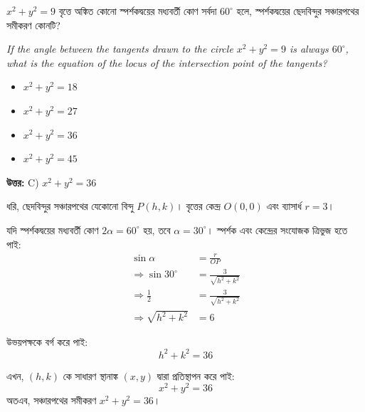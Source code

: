 \documentclass[12pt, a4paper]{article}
\begin{document}
\begin{tcolorbox}[questionbox={প্রশ্ন (Question) 22}]
    \noindent
    $x^2 + y^2 = 9$ বৃত্তে অঙ্কিত কোনো স্পর্শকদ্বয়ের মধ্যবর্তী কোণ সর্বদা $60^{\circ}$ হলে, স্পর্শকদ্বয়ের ছেদবিন্দুর সঞ্চারপথের সমীকরণ কোনটি?
    
    \vspace{0.8em}
    \begin{english}
    \noindent\textit{\color{darkgray}
    If the angle between the tangents drawn to the circle $x^2 + y^2 = 9$ is always $60^{\circ}$, what is the equation of the locus of the intersection point of the tangents?
    }
    \end{english}
\end{tcolorbox}

\vspace{1em}
\begin{itemize}[label={}, leftmargin=1cm, itemsep=0.5em]
    \item[\textbf{A)}] $x^2 + y^2 = 18$
    \item[\textbf{B)}] $x^2 + y^2 = 27$
    \item[\textbf{C)}] $x^2 + y^2 = 36$
    \item[\textbf{D)}] $x^2 + y^2 = 45$
\end{itemize}

\vspace{0.5em}
\begin{tcolorbox}[answerbox]
    \textbf{\color{success} উত্তর:} C) $x^2 + y^2 = 36$
\end{tcolorbox}
\vspace{1em}

\begin{tcolorbox}[solutionbox={সমাধান (Solution)}]
    \noindent
    ধরি, ছেদবিন্দুর সঞ্চারপথের যেকোনো বিন্দু $P(h, k)$। 
    বৃত্তের কেন্দ্র $O(0, 0)$ এবং ব্যাসার্ধ $r = 3$। 
    
    যদি স্পর্শকদ্বয়ের মধ্যবর্তী কোণ $2\alpha = 60^{\circ}$ হয়, তবে $\alpha = 30^{\circ}$। 
    স্পর্শক এবং কেন্দ্রের সংযোজক ত্রিভুজ হতে পাই:
    \begin{align*}
        \sin\alpha &= \frac{r}{OP} \\
        \Rightarrow \sin 30^{\circ} &= \frac{3}{\sqrt{h^2 + k^2}} \\
        \Rightarrow \frac{1}{2} &= \frac{3}{\sqrt{h^2 + k^2}} \\
        \Rightarrow \sqrt{h^2 + k^2} &= 6
    \end{align*}
    
    উভয়পক্ষকে বর্গ করে পাই: 
    \[ h^2 + k^2 = 36 \]
    
    এখন, $(h, k)$ কে সাধারণ স্থানাঙ্ক $(x, y)$ দ্বারা প্রতিস্থাপন করে পাই: 
    \[ x^2 + y^2 = 36 \]
    অতএব, সঞ্চারপথের সমীকরণ \textbf{$x^2 + y^2 = 36$}।
\end{tcolorbox}
\end{document}
